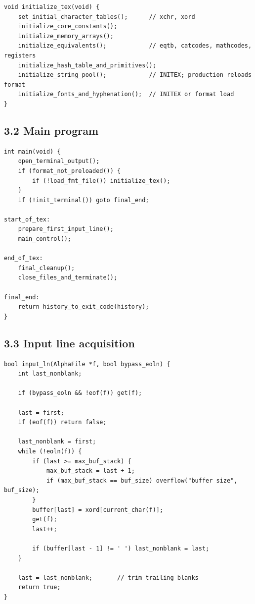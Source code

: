 \documentclass[11pt]{article}
\begin{document}
\begin{verbatim}
void initialize_tex(void) {
    set_initial_character_tables();      // xchr, xord
    initialize_core_constants();
    initialize_memory_arrays();
    initialize_equivalents();            // eqtb, catcodes, mathcodes, registers
    initialize_hash_table_and_primitives();
    initialize_string_pool();            // INITEX; production reloads format
    initialize_fonts_and_hyphenation();  // INITEX or format load
}
\end{verbatim}

\subsection{3.2 Main program}\label{main-program}

\begin{verbatim}
int main(void) {
    open_terminal_output();
    if (format_not_preloaded()) {
        if (!load_fmt_file()) initialize_tex();
    }
    if (!init_terminal()) goto final_end;

start_of_tex:
    prepare_first_input_line();
    main_control();

end_of_tex:
    final_cleanup();
    close_files_and_terminate();

final_end:
    return history_to_exit_code(history);
}
\end{verbatim}

\subsection{3.3 Input line acquisition}\label{input-line-acquisition}

\begin{verbatim}
bool input_ln(AlphaFile *f, bool bypass_eoln) {
    int last_nonblank;

    if (bypass_eoln && !eof(f)) get(f);

    last = first;
    if (eof(f)) return false;

    last_nonblank = first;
    while (!eoln(f)) {
        if (last >= max_buf_stack) {
            max_buf_stack = last + 1;
            if (max_buf_stack == buf_size) overflow("buffer size", buf_size);
        }
        buffer[last] = xord[current_char(f)];
        get(f);
        last++;

        if (buffer[last - 1] != ' ') last_nonblank = last;
    }

    last = last_nonblank;       // trim trailing blanks
    return true;
}
\end{verbatim}
\end{document}
